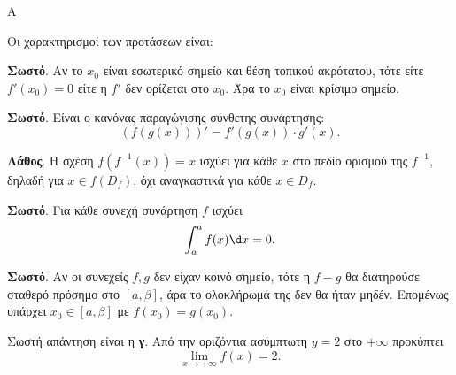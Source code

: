 \begin{thema}{Α}
\begin{erwthma}
\item {}

\item {}

\item {}

\item Οι χαρακτηρισμοί των προτάσεων είναι:
\begin{alist}
\item \textbf{Σωστό}. Αν το $x_0$ είναι εσωτερικό σημείο και θέση τοπικού ακρότατου, τότε είτε $f'(x_0)=0$ είτε η $f'$ δεν ορίζεται στο $x_0$. Άρα το $x_0$ είναι κρίσιμο σημείο.
\item \textbf{Σωστό}. Είναι ο κανόνας παραγώγισης σύνθετης συνάρτησης:
\[ (f(g(x)))'=f'(g(x))\cdot g'(x). \]
\item \textbf{Λάθος}. Η σχέση $f(f^{-1}(x))=x$ ισχύει για κάθε $x$ στο πεδίο ορισμού της $f^{-1}$, δηλαδή για $x\in f(D_f)$, όχι αναγκαστικά για κάθε $x\in D_f$.
\item \textbf{Σωστό}. Για κάθε συνεχή συνάρτηση $f$ ισχύει
\[ \dint_a^a f(x)\d x=0. \]
\item \textbf{Σωστό}. Αν οι συνεχείς $f,g$ δεν είχαν κοινό σημείο, τότε η $f-g$ θα διατηρούσε σταθερό πρόσημο στο $[a,\beta]$, άρα το ολοκλήρωμά της δεν θα ήταν μηδέν. Επομένως υπάρχει $x_0\in[a,\beta]$ με $f(x_0)=g(x_0)$.
\end{alist}

\item Σωστή απάντηση είναι η \textbf{γ}. Από την οριζόντια ασύμπτωτη $y=2$ στο $+\infty$ προκύπτει
\[ \lim_{x\to+\infty}f(x)=2. \]
\end{erwthma}
\end{thema}

